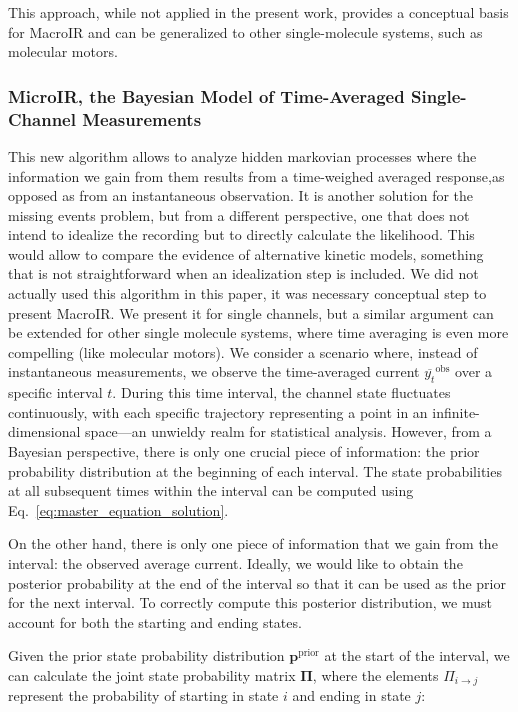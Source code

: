 \documentclass[pdflatex,sn-mathphys-num]{sn-jnl}%
\theoremstyle{thmstyleone}%
\theoremstyle{thmstyletwo}%
\theoremstyle{thmstylethree}%
\begin{document}
This approach, while not applied in the present work, provides a conceptual basis for MacroIR and can be generalized to other single-molecule systems, such as molecular motors.


\subsubsection{MicroIR, the Bayesian Model of Time-Averaged Single-Channel Measurements}

This new algorithm allows to analyze hidden markovian processes where the information we gain from them results from a time-weighed averaged response,as opposed as from an instantaneous observation. It is another solution for the missing events problem, but from a different perspective, one that does not intend to idealize the recording but to directly calculate the likelihood. This would allow to compare the evidence of alternative kinetic models, something that is not straightforward when an idealization step is included.  
We did not actually used this algorithm in this paper, it was necessary conceptual step to present MacroIR. We present it for single channels, but a similar argument can be extended for other single molecule systems, where time averaging is even more compelling (like molecular motors). 
We consider a scenario where, instead of instantaneous measurements, we observe the time-averaged current \( \overline{y_t}^{\text{obs}} \) over a specific interval \( t \). During this time interval, the channel state fluctuates continuously, with each specific trajectory representing a point in an infinite-dimensional space—an unwieldy realm for statistical analysis. However, from a Bayesian perspective, there is only one crucial piece of information: the prior probability distribution at the beginning of each interval. The state probabilities at all subsequent times within the interval can be computed using Eq.~\ref{eq:master_equation_solution}. 

On the other hand, there is only one piece of information that we gain from the interval: the observed average current. Ideally, we would like to obtain the posterior probability at the end of the interval so that it can be used as the prior for the next interval. To correctly compute this posterior distribution, we must account for both the starting and ending states.

Given the prior state probability distribution \( \boldsymbol{p}^{\text{prior}} \) at the start of the interval, we can calculate the joint state probability matrix \( \boldsymbol{\Pi} \), where the elements \( \Pi_{i \rightarrow j} \) represent the probability of starting in state \( i \) and ending in state \( j \):
\end{document}
